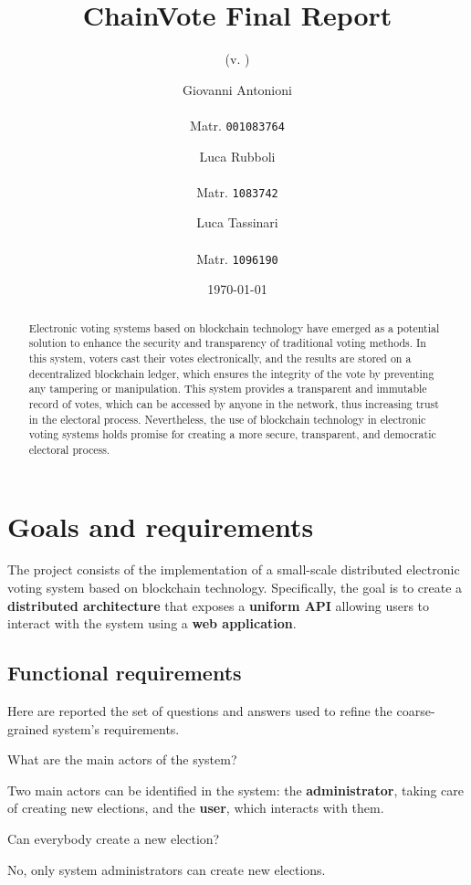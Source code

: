 \documentclass{scrartcl}
\title{\LARGE
    ChainVote Final Report
}
\subtitle{(v. \version)}
\author{
    Giovanni Antonioni \\ \emailaddr{giovanni.antonioni2@studio.unibo.it} \\ Matr. \texttt{001083764}
    \and 
    Luca Rubboli \\ \emailaddr{luca.rubboli2@studio.unibo.it} \\ Matr. \texttt{1083742}
    \and
    Luca Tassinari \\ \emailaddr{luca.tassinari10@studio.unibo.it} \\ Matr. \texttt{1096190}
}
\date{\today}
\begin{document}
\maketitle

\begin{abstract}
    Electronic voting systems based on blockchain technology have emerged as a potential solution to enhance the security and transparency of traditional voting methods. In this system, voters cast their votes electronically, and the results are stored on a decentralized blockchain ledger, which ensures the integrity of the vote by preventing any tampering or manipulation. This system provides a transparent and immutable record of votes, which can be accessed by anyone in the network, thus increasing trust in the electoral process. Nevertheless, the use of blockchain technology in electronic voting systems holds promise for creating a more secure, transparent, and democratic electoral process.
\end{abstract}

\section{Goals and requirements}

The project consists of the implementation of a small-scale distributed electronic voting system based on blockchain technology.
%
Specifically, the goal is to create a \textbf{distributed architecture} that exposes a \textbf{uniform API} allowing users to interact with the system using a \textbf{web application}.

\subsection{Functional requirements}

Here are reported the set of questions and answers used to refine the coarse-grained system's requirements.

\begin{Question}
    What are the main actors of the system?
\end{Question}
\begin{Answer}
    Two main actors can be identified in the system: the \textbf{administrator}, taking care of creating new elections, and the \textbf{user}, which interacts with them.
\end{Answer}

\begin{Question}
    Can everybody create a new election?
\end{Question}
\begin{Answer}
    No, only system administrators can create new elections.
\end{Answer}
\end{document}
